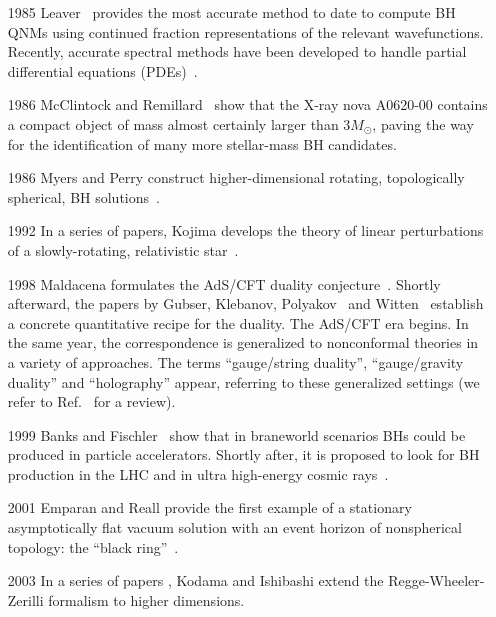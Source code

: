 \documentclass[11pt]{article}
\numberwithin{equation}{section} %
\begin{document}
\begin{itemize}[noitemsep]
\item[1985] Leaver~\cite{Leaver:1985ax,leJMP,Leaver:1986gd}
provides the most accurate method to date to compute BH QNMs
using continued fraction representations of the relevant wavefunctions.
Recently, accurate spectral methods have been developed to handle partial differential equations (PDEs)~\cite{Cardoso:2013pza}.

\item[1986] McClintock and Remillard~\cite{McClintock:1986}
show that the X-ray nova A0620-00 contains a compact object of mass almost
certainly larger than $3M_\odot$, paving the way for the identification of
many more stellar-mass BH candidates. 

\item[1986] Myers and Perry construct higher-dimensional
rotating, topologically spherical, BH solutions~\cite{Myers:1986un}.

 \item[1992] In a series of papers, Kojima develops the theory of linear perturbations of a slowly-rotating, relativistic star~\cite{Kojima:1992ie,1993PThPh..90..977K,1993ApJ...414..247K}. 

 \item[1998] Maldacena formulates the
AdS/CFT duality conjecture~\cite{Maldacena:1997re}. Shortly afterward, the papers by Gubser, Klebanov, Polyakov~\cite{Gubser:1998bc} and
Witten~\cite{Witten:1998qj} establish a concrete quantitative recipe for the
duality. The AdS/CFT era begins. In the same year, the correspondence is generalized to
nonconformal theories in a variety of approaches. The terms ``gauge/string duality'', ``gauge/gravity duality'' and ``holography'' appear, referring to these generalized settings (we refer to Ref.~\cite{Aharony:1999ti} for a review).

\item[1999] Banks and Fischler~\cite{Banks:1999gd} show that in
braneworld scenarios BHs could be
produced in particle accelerators. Shortly after, it is proposed to look
for BH production in the LHC and in ultra high-energy cosmic
rays~\cite{Dimopoulos:2001hw,Giddings:2001bu}.

\item[2001] Emparan and Reall provide the first example of a stationary asymptotically flat vacuum solution 
with an event horizon of nonspherical topology: the ``black ring''~\cite{Emparan:2001wn}.

\item[2003] In a series of papers
\cite{Kodama:2003jz,Ishibashi:2003ap,Kodama:2003kk}, Kodama and Ishibashi
extend the Regge-Wheeler-Zerilli formalism to higher dimensions.


\end{itemize}
\end{document}
